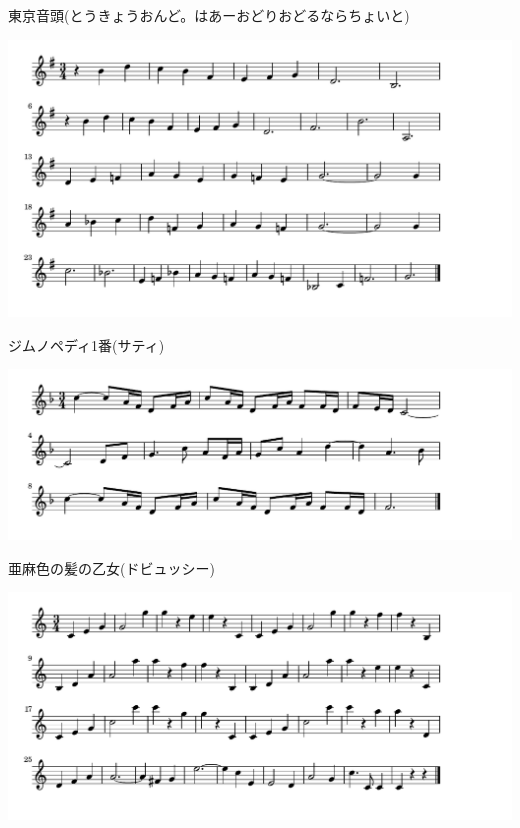 \documentclass[a4paper]{ltjsarticle}
\begin{document}
\vspace{-10mm} \hspace{10mm}
東京音頭(とうきょうおんど。はあーおどりおどるならちょいと)

\includegraphics[clip]{gymnopedies_crop.pdf}

\vspace{-10mm} \hspace{10mm}
ジムノペディ1番(サティ)

\includegraphics[clip]{amairodebussy_crop.pdf}

\vspace{-10mm} \hspace{10mm}
亜麻色の髪の乙女(ドビュッシー)

\includegraphics[clip]{donau_crop.pdf}
\end{document}
